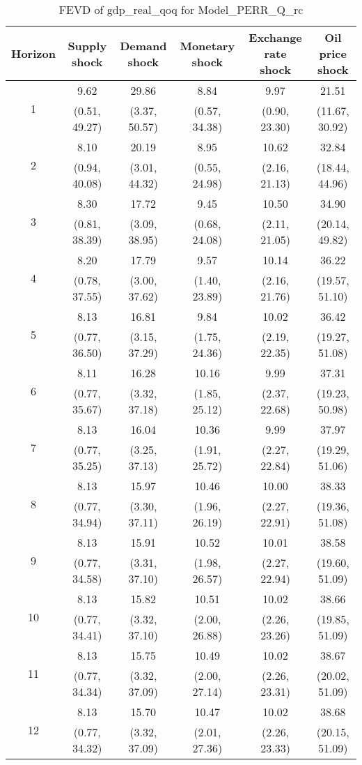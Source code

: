 \documentclass{article}
\begin{document}
\begin{table}
	\footnotesize
	\caption{FEVD of gdp_real_qoq for Model_PERR_Q_rc}
	\begin{tabular}{cccccc}
		Horizon & Supply shock & Demand shock & Monetary shock & Exchange rate shock & Oil price shock\\ \hline
		\multirow{2}{*}{1} & 9.62 & 29.86 & 8.84 & 9.97 & 21.51\\
		 & (0.51, 49.27) & (3.37, 50.57) & (0.57, 34.38) & (0.90, 23.30) & (11.67, 30.92)\\
		\multirow{2}{*}{2} & 8.10 & 20.19 & 8.95 & 10.62 & 32.84\\
		 & (0.94, 40.08) & (3.01, 44.32) & (0.55, 24.98) & (2.16, 21.13) & (18.44, 44.96)\\
		\multirow{2}{*}{3} & 8.30 & 17.72 & 9.45 & 10.50 & 34.90\\
		 & (0.81, 38.39) & (3.09, 38.95) & (0.68, 24.08) & (2.11, 21.05) & (20.14, 49.82)\\
		\multirow{2}{*}{4} & 8.20 & 17.79 & 9.57 & 10.14 & 36.22\\
		 & (0.78, 37.55) & (3.00, 37.62) & (1.40, 23.89) & (2.16, 21.76) & (19.57, 51.10)\\
		\multirow{2}{*}{5} & 8.13 & 16.81 & 9.84 & 10.02 & 36.42\\
		 & (0.77, 36.50) & (3.15, 37.29) & (1.75, 24.36) & (2.19, 22.35) & (19.27, 51.08)\\
		\multirow{2}{*}{6} & 8.11 & 16.28 & 10.16 & 9.99 & 37.31\\
		 & (0.77, 35.67) & (3.32, 37.18) & (1.85, 25.12) & (2.37, 22.68) & (19.23, 50.98)\\
		\multirow{2}{*}{7} & 8.13 & 16.04 & 10.36 & 9.99 & 37.97\\
		 & (0.77, 35.25) & (3.25, 37.13) & (1.91, 25.72) & (2.27, 22.84) & (19.29, 51.06)\\
		\multirow{2}{*}{8} & 8.13 & 15.97 & 10.46 & 10.00 & 38.33\\
		 & (0.77, 34.94) & (3.30, 37.11) & (1.96, 26.19) & (2.27, 22.91) & (19.36, 51.08)\\
		\multirow{2}{*}{9} & 8.13 & 15.91 & 10.52 & 10.01 & 38.58\\
		 & (0.77, 34.58) & (3.31, 37.10) & (1.98, 26.57) & (2.27, 22.94) & (19.60, 51.09)\\
		\multirow{2}{*}{10} & 8.13 & 15.82 & 10.51 & 10.02 & 38.66\\
		 & (0.77, 34.41) & (3.32, 37.10) & (2.00, 26.88) & (2.26, 23.26) & (19.85, 51.09)\\
		\multirow{2}{*}{11} & 8.13 & 15.75 & 10.49 & 10.02 & 38.67\\
		 & (0.77, 34.34) & (3.32, 37.09) & (2.00, 27.14) & (2.26, 23.31) & (20.02, 51.09)\\
		\multirow{2}{*}{12} & 8.13 & 15.70 & 10.47 & 10.02 & 38.68\\
		 & (0.77, 34.32) & (3.32, 37.09) & (2.01, 27.36) & (2.26, 23.33) & (20.15, 51.09)\\
	\end{tabular}
\label{tab:fevd-Model_PERR_Q_rc-gdp_real_qoq}
\end{table}
\end{document}
